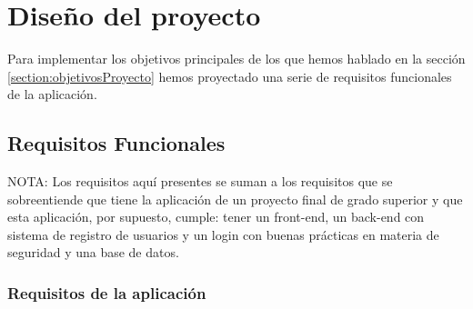 \documentclass[a4paper,12pt]{report}
\begin{document}
		
		

		
		

		
		
		
		
		
		
		
		
		
		
			
			
	
		
	

		



		
	

		
	

		


		

		
		
		
		
	
	\chapter{Diseño del proyecto}  %
	
		
				
		Para implementar los objetivos principales de los que hemos hablado en la sección \ref{section:objetivosProyecto} hemos proyectado una serie de requisitos funcionales de la aplicación.
		
		


		
		
		
		
		\section{Requisitos Funcionales}
		
			NOTA: Los requisitos aquí presentes se suman a los requisitos que se sobreentiende que tiene la aplicación de un proyecto final de grado superior y que esta aplicación, por supuesto, cumple: tener un front-end, un back-end con sistema de registro de usuarios y un login con buenas prácticas en materia de seguridad y una base de datos.
		
		
			\subsection{Requisitos de la aplicación}
			
		

			
\end{document}
